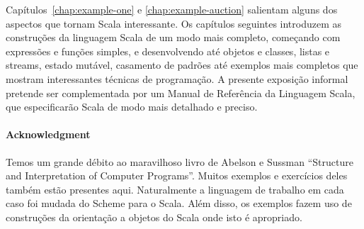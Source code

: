 \documentclass[a4paper,12pt,twoside,titlepage]{book}
\begin{document}
Capítulos~\ref{chap:example-one} e \ref{chap:example-auction}
salientam alguns dos aspectos que tornam Scala interessante. Os
capítulos seguintes introduzem as construções da linguagem Scala de um
modo mais completo, começando com expressões e funções simples, e 
desenvolvendo até objetos e classes, listas e streams, estado 
mutável, casamento de padrões até exemplos mais completos que mostram
interessantes técnicas de programação. A presente exposição informal
pretende ser complementada por um Manual de Referência da Linguagem Scala, que
especificarão Scala de modo mais detalhado e preciso. 


\paragraph{Acknowledgment}
Temos um grande débito ao maravilhoso livro de Abelson e Sussman
``Structure and Interpretation of Computer
Programs''\cite{abelson-sussman:structure}. Muitos exemplos e exercícios 
deles também estão presentes aqui. Naturalmente a linguagem de trabalho em
cada caso foi mudada do Scheme para o Scala. Além disso, os exemplos
fazem uso de construções da orientação a objetos do Scala onde isto é
apropriado. 





\end{document}
